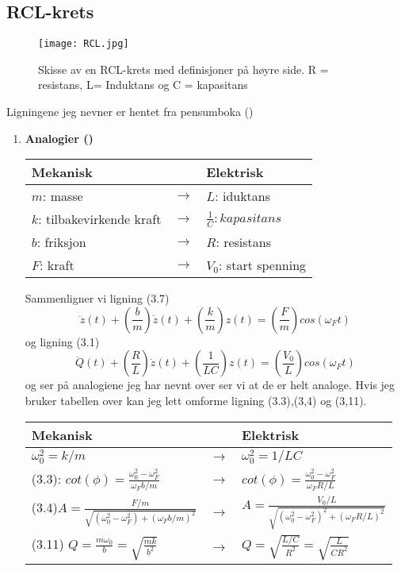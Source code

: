 \documentclass[a4paper,12pt,norsk]{article}
\begin{document}
\subsection{RCL-krets}
\begin{figure}[h!]
\texttt{[image: RCL.jpg]}
\caption[RCL-krets]{Skisse av en RCL-krets med definisjoner på høyre side. R = resistans, L= Induktans og C = kapasitans}
\label{RCL}
\end{figure}
Ligningene jeg nevner er hentet fra pensumboka (\cite{vistnes16})
\begin{enumerate}[label=(\alph*)]
\item
\begin{center}
\textbf{Analogier (\cite{forelesning})}\\
\begin{tabular}{| l  c | l |}
\hline
\textbf{Mekanisk} & &\textbf{Elektrisk}\\
\hline
$m$: masse & $\rightarrow$& $L$: iduktans\\
$k$: tilbakevirkende kraft& $\rightarrow$& $\frac{1}{C}: kapasitans$\\
$b$: friksjon & $\rightarrow$& $R$: resistans\\
$F$: kraft & $\rightarrow$ & $V_0$: start spenning\\
\hline
\end{tabular}
\end{center}
Sammenligner vi ligning (3.7) 
$$
\ddot{z}(t) + \left(\frac{b}{m} \right)\dot{z}(t) + \left( \frac{k}{m}\right)z(t) = \left( \frac{F}{m}\right)cos(\omega_F t)
$$ og ligning (3.1) 
$$
\ddot{Q}(t) + \left(\frac{R}{L} \right)\dot{z}(t) + \left( \frac{1}{LC}\right)z(t) = \left( \frac{V_0}{L}\right)cos(\omega_F t)
$$
og ser på analogiene jeg har nevnt over ser vi at de er helt analoge. Hvis jeg bruker tabellen over kan jeg lett omforme ligning (3.3),(3,4) og (3,11).\\
\begin{center}
\begin{tabular}{| l  c | l |}
\hline
\textbf{Mekanisk} & &\textbf{Elektrisk}\\
\hline
$\omega_0^2 = k/m$ &$\rightarrow$& $\omega_0^2 =1/LC$\\ 
(3.3): $cot(\phi) = \frac{\omega_0^2- \omega_F^2}{\omega_Fb/m}$ & $\rightarrow$& $cot(\phi) = \frac{\omega_0^2- \omega_F^2}{\omega_FR/L}$ \\
(3.4)$A = \frac{F/m}{\sqrt{(\omega_0^2- \omega_F^2)+(\omega_F b/m)^2}}$& $\rightarrow$& $A = \frac{V_0/L}{\sqrt{(\omega_0^2- \omega_F^2)^2+(\omega_F R/L)^2}}$\\
(3.11) $Q =\frac{m\omega_0}{b} =\sqrt{\frac{mk}{b^2}}$ & $\rightarrow$& $Q = \sqrt{\frac{L/C}{R^2}}=\sqrt{\frac{L}{CR^2}}$\\
\hline
\end{tabular}
\end{center}


\end{enumerate}
\end{document}
